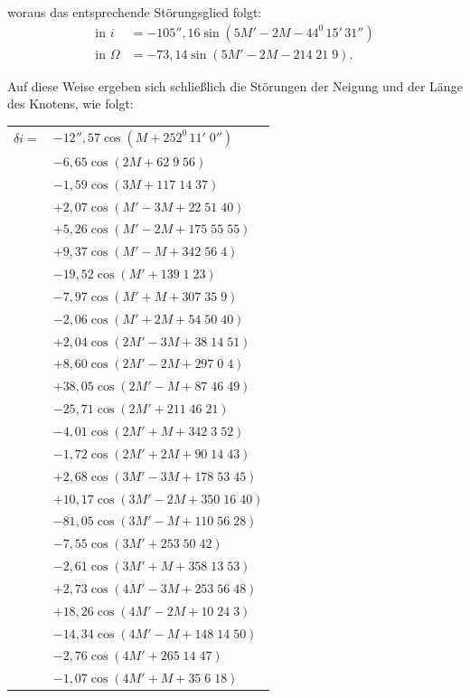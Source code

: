 \endgroup
\noindent woraus das entsprechende Störungsglied folgt:
\[
\begin{aligned}
\text{in }i&=-105''{,}16\sin(5M'-2M-44^0\,15'\,31'')\\
\text{in }\Omega&=-73{,}14\sin(5M'-2M-214\;21\;9).
\end{aligned}
\]
\par\noindent\hspace*{\parindent}Auf diese Weise ergeben sich schließlich die Störungen der Neigung und der Länge des Knotens, wie folgt:
\begingroup
\renewcommand{\arraystretch}{1.15}
\begin{longtable}{@{}r@{}l@{}}
\(\delta i={}\)&\(-12''{,}57\cos(M+252^0\,11'\;0'')\)\\
&\(-6{,}65\cos(2M+62\;9\;56)\)\\
&\(-1{,}59\cos(3M+117\;14\;37)\)\\
&\(+2{,}07\cos(M'-3M+22\;51\;40)\)\\
&\(+5{,}26\cos(M'-2M+175\;55\;55)\)\\
&\(+9{,}37\cos(M'-M+342\;56\;4)\)\\
&\(-19{,}52\cos(M'+139\;1\;23)\)\\
&\(-7{,}97\cos(M'+M+307\;35\;9)\)\\
&\(-2{,}06\cos(M'+2M+54\;50\;40)\)\\
&\(+2{,}04\cos(2M'-3M+38\;14\;51)\)\\
&\(+8{,}60\cos(2M'-2M+297\;0\;4)\)\\
&\(+38{,}05\cos(2M'-M+87\;46\;49)\)\\
&\(-25{,}71\cos(2M'+211\;46\;21)\)\\
&\(-4{,}01\cos(2M'+M+342\;3\;52)\)\\
&\(-1{,}72\cos(2M'+2M+90\;14\;43)\)\\
&\(+2{,}68\cos(3M'-3M+178\;53\;45)\)\\
&\(+10{,}17\cos(3M'-2M+350\;16\;40)\)\\
&\(-81{,}05\cos(3M'-M+110\;56\;28)\)\\
&\(-7{,}55\cos(3M'+253\;50\;42)\)\\
&\(-2{,}61\cos(3M'+M+358\;13\;53)\)\\
&\(+2{,}73\cos(4M'-3M+253\;56\;48)\)\\
&\(+18{,}26\cos(4M'-2M+10\;24\;3)\)\\
&\(-14{,}34\cos(4M'-M+148\;14\;50)\)\\
&\(-2{,}76\cos(4M'+265\;14\;47)\)\\
&\(-1{,}07\cos(4M'+M+35\;6\;18)\)\\

\end{longtable}
